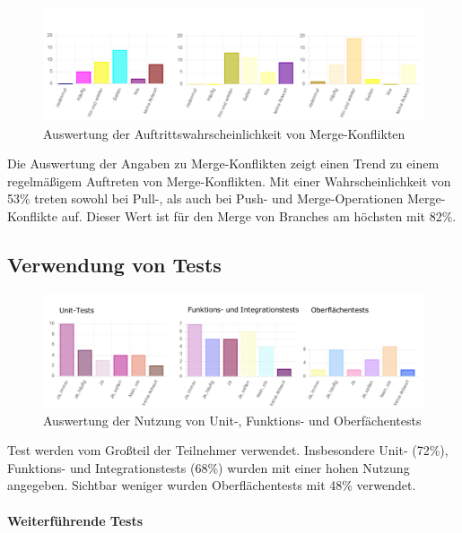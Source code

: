 \begin{figure}[htbp]
  \includegraphics[width=\textwidth, height=\textheight, keepaspectratio]
    {resources/survey-vcs-merge.pdf}
  \caption{Auswertung der Auftrittswahrscheinlichkeit von Merge-Konflikten}
\end{figure}

Die Auswertung der Angaben zu Merge-Konflikten zeigt einen Trend zu einem regelmäßigem Auftreten von Merge-Konflikten. Mit einer Wahrscheinlichkeit von 53\% treten sowohl bei Pull-, als auch bei Push- und Merge-Operationen Merge-Konflikte auf. Dieser Wert ist für den Merge von Branches am höchsten mit 82\%. 

\pagebreak

\subsection{Verwendung von Tests}

\begin{figure}[htbp]
  \includegraphics[width=\textwidth, height=\textheight, keepaspectratio]
    {resources/survey-test-usage.pdf}
  \caption{Auswertung der Nutzung von Unit-, Funktions- und Oberfächentests}
\end{figure}

Test werden vom Großteil der Teilnehmer verwendet. Insbesondere Unit- (72\%), Funktions- und Integrationstests (68\%) wurden mit einer hohen Nutzung angegeben. Sichtbar weniger wurden Oberflächentests mit 48\% verwendet.

\paragraph{Weiterführende Tests}

